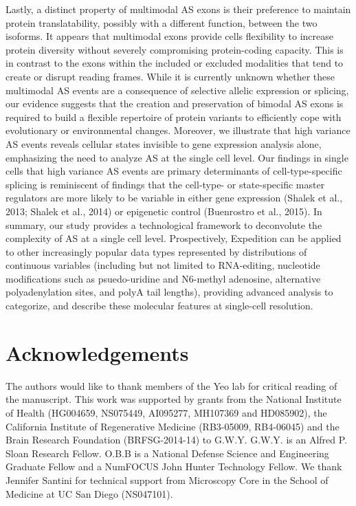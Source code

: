 Lastly, a distinct property of multimodal AS exons is their preference to maintain protein translatability, possibly with a different function, between the two isoforms. It appears that multimodal exons provide cells flexibility to increase protein diversity without severely compromising protein-coding capacity. This is in contrast to the exons within the included or excluded modalities that tend to create or disrupt reading frames. While it is currently unknown whether these multimodal AS events are a consequence of selective allelic expression or splicing, our evidence suggests that the creation and preservation of bimodal AS exons is required to build a flexible repertoire of protein variants to efficiently cope with evolutionary or environmental changes. Moreover, we illustrate that high variance AS events reveals cellular states invisible to gene expression analysis alone, emphasizing the need to analyze AS at the single cell level. Our findings in single cells that high variance AS events are primary determinants of cell-type-specific splicing is reminiscent of findings that the cell-type- or state-specific master regulators are more likely to be variable in either gene expression (Shalek et al., 2013; Shalek et al., 2014) or epigenetic control (Buenrostro et al., 2015).
In summary, our study provides a technological framework to deconvolute the complexity of AS at a single cell level. Prospectively, Expedition can be applied to other increasingly popular data types represented by distributions of continuous variables (including but not limited to RNA-editing, nucleotide modifications such as psuedo-uridine and N6-methyl adenosine, alternative polyadenylation sites, and polyA tail lengths), providing advanced analysis to categorize, and describe these molecular features at single-cell resolution.

\section{Acknowledgements}
The authors would like to thank members of the Yeo lab for critical reading of the manuscript.  This work was supported by grants from the National Institute of Health (HG004659, NS075449, AI095277, MH107369 and HD085902), the California Institute of Regenerative Medicine (RB3-05009, RB4-06045) and the Brain Research Foundation (BRFSG-2014-14) to G.W.Y. G.W.Y. is an Alfred P. Sloan Research Fellow. O.B.B is a National Defense Science and Engineering Graduate Fellow and a NumFOCUS John Hunter Technology Fellow. We thank Jennifer Santini for technical support from Microscopy Core in the School of Medicine at UC San Diego (NS047101).
